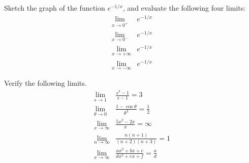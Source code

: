 \begin{hwsection}
\begin{hw}
Sketch the graph of the function $e^{-1/x}$, and evaluate the following four limits:
\begin{align*}
  \lim_{x\rightarrow 0^{+}} & e^{-1/x} \\
  \lim_{x\rightarrow 0^{-}} & e^{-1/x} \\
  \lim_{x\rightarrow +\infty} & e^{-1/x} \\
  \lim_{x\rightarrow -\infty} & e^{-1/x} 
\end{align*}
\end{hw}

\begin{hw}
Verify the following limits.
\begin{align*}
  \lim_{s\rightarrow 1} & \frac{s^3-1}{s-1} = 3 \\
  \lim_{\theta\rightarrow 0} & \frac{1-\cos\theta}{\theta^2} = \frac{1}{2} \\
  \lim_{x\rightarrow \infty} & \frac{5x^2-2x}{x} = \infty \\
  \lim_{n\rightarrow \infty} & \frac{n(n+1)}{(n+2)(n+3)} = 1 \\
  \lim_{x\rightarrow \infty} & \frac{ax^2+bx+c}{dx^2+ex+f} = \frac{a}{d}
\end{align*}
\granville
\end{hw}

\end{hwsection}
